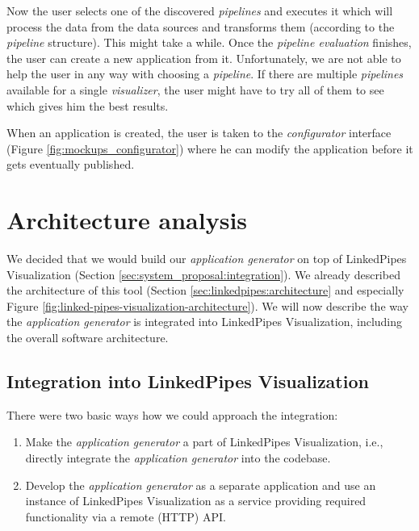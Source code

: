 Now the user selects one of the discovered \emph{pipelines} and executes it which will process the data from the data sources and transforms them (according to the \emph{pipeline} structure). This might take a while. Once the \emph{pipeline evaluation} finishes, the user can create a new application from it. Unfortunately, we are not able to help the user in any way with choosing a \emph{pipeline}. If there are multiple \emph{pipelines} available for a single \emph{visualizer}, the user might have to try all of them to see which gives him the best results.

When an application is created, the user is taken to the \emph{configurator} interface (Figure \ref{fig:mockups_configurator}) where he can modify the application before it gets eventually published.

\section{Architecture analysis}
\label{sec:system-proposal:architecture-analysis}

We decided that we would build our \emph{application generator} on top of LinkedPipes Visualization (Section \ref{sec:system_proposal:integration}). We already described the architecture of this tool (Section \ref{sec:linkedpipes:architecture} and especially Figure \ref{fig:linked-pipes-visualization-architecture}). We will now describe the way the \emph{application generator} is integrated into LinkedPipes Visualization, including the overall software architecture.

\subsection{Integration into LinkedPipes Visualization}
\label{sec:system-proposal:architecture-analysis:integration}

There were two basic ways how we could approach the integration:

\begin{enumerate}
\item Make the \emph{application generator} a part of LinkedPipes Visualization, i.e., directly integrate the \emph{application generator} into the codebase.
\item Develop the \emph{application generator} as a separate application and use an instance of LinkedPipes Visualization as a service providing required functionality via a remote (HTTP) API.
\end{enumerate}

